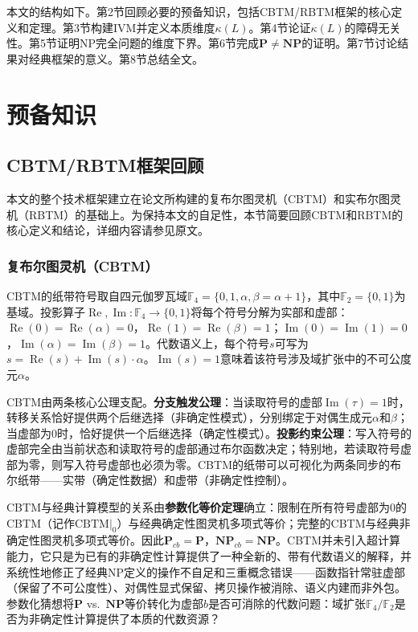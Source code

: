 \documentclass{ctexart}
\begin{document}
	本文的结构如下。第2节回顾必要的预备知识，包括CBTM/RBTM框架的核心定义和定理。第3节构建IVM并定义本质维度$\kappa(L)$。第4节论证$\kappa(L)$的障碍无关性。第5节证明NP完全问题的维度下界。第6节完成$\mathbf{P} \neq \mathbf{NP}$的证明。第7节讨论结果对经典框架的意义。第8节总结全文。
	
	\section{预备知识}
	
	\subsection{CBTM/RBTM框架回顾}
	
	本文的整个技术框架建立在论文\cite{models2026}所构建的复布尔图灵机（CBTM）和实布尔图灵机（RBTM）的基础上。为保持本文的自足性，本节简要回顾CBTM和RBTM的核心定义和结论，详细内容请参见原文。
	
	\subsubsection*{复布尔图灵机（CBTM）}
	
	CBTM的纸带符号取自四元伽罗瓦域$\mathbb{F}_4 = \{0, 1, \alpha, \beta = \alpha+1\}$，其中$\mathbb{F}_2 = \{0,1\}$为基域。投影算子$\operatorname{Re}, \operatorname{Im}: \mathbb{F}_4 \to \{0,1\}$将每个符号分解为实部和虚部：$\operatorname{Re}(0)=\operatorname{Re}(\alpha)=0$，$\operatorname{Re}(1)=\operatorname{Re}(\beta)=1$；$\operatorname{Im}(0)=\operatorname{Im}(1)=0$，$\operatorname{Im}(\alpha)=\operatorname{Im}(\beta)=1$。代数语义上，每个符号$s$可写为$s = \operatorname{Re}(s) + \operatorname{Im}(s) \cdot \alpha$。$\operatorname{Im}(s)=1$意味着该符号涉及域扩张中的不可公度元$\alpha$。
	
	CBTM由两条核心公理支配。\textbf{分支触发公理}：当读取符号的虚部$\operatorname{Im}(\tau)=1$时，转移关系恰好提供两个后继选择（非确定性模式），分别绑定于对偶生成元$\alpha$和$\beta$；当虚部为$0$时，恰好提供一个后继选择（确定性模式）。\textbf{投影约束公理}：写入符号的虚部完全由当前状态和读取符号的虚部通过布尔函数决定；特别地，若读取符号虚部为零，则写入符号虚部也必须为零。CBTM的纸带可以可视化为两条同步的布尔纸带——实带（确定性数据）和虚带（非确定性控制）。
	
	CBTM与经典计算模型的关系由\textbf{参数化等价定理}确立：限制在所有符号虚部为$0$的CBTM（记作$\mathrm{CBTM}|_0$）与经典确定性图灵机多项式等价；完整的CBTM与经典非确定性图灵机多项式等价。因此$\mathbf{P}_{cb} = \mathbf{P}$，$\mathbf{NP}_{cb} = \mathbf{NP}$。CBTM并未引入超计算能力，它只是为已有的非确定性计算提供了一种全新的、带有代数语义的解释，并系统性地修正了经典NP定义的操作不自足和三重概念错误——函数指针常驻虚部（保留了不可公度性）、对偶性显式保留、拷贝操作被消除、语义内建而非外包。参数化猜想将$\mathbf{P}$ vs.\ $\mathbf{NP}$等价转化为虚部$b$是否可消除的代数问题：域扩张$\mathbb{F}_4/\mathbb{F}_2$是否为非确定性计算提供了本质的代数资源？
	
\end{document}
